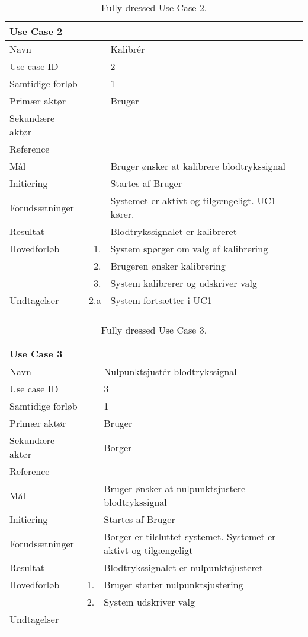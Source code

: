 \begin{longtabu} to  %
    {\large \textbf{Use Case 2}} && \\
    \toprule
    Navn &&    Kalibrér\\
    Use case ID &&    2\\
    Samtidige forløb &&    1\\
    Primær aktør &&    Bruger\\
    Sekundære aktør &&	 \\
    Reference &&      \\
    Mål &&    Bruger ønsker at kalibrere blodtrykssignal\\
    Initiering &&	Startes af Bruger\\
    Forudsætninger &&  Systemet er aktivt og tilgængeligt. UC1 kører.\\
    Resultat &&		Blodtrykssignalet er kalibreret                         \\ \midrule
    Hovedforløb &    1. &    System spørger om valg af kalibrering\\[-1ex]   				
    			&    2. &    Brugeren ønsker kalibrering\\
                &    3.	&	 System kalibrerer og udskriver valg\newline\\ \midrule
                
    Undtagelser &    2.a &   System fortsætter i UC1  \\ \bottomrule
\caption{Fully dressed Use Case 2.}
\label{UC2}
\end{longtabu}


\begin{longtabu} to  %
    {\large \textbf{Use Case 3}} && \\
    \toprule
    Navn &&    Nulpunktsjustér blodtrykssignal\\
    Use case ID &&    3\\
    Samtidige forløb &&    1\\
    Primær aktør &&    Bruger\\
    Sekundære aktør &&	Borger \\
    Reference &&      \\
    Mål &&    Bruger ønsker at nulpunktsjustere blodtrykssignal\\
    Initiering &&	Startes af Bruger\\
    Forudsætninger &&  Borger er tilsluttet systemet. Systemet er aktivt og tilgængeligt\\
    Resultat &&		Blodtrykssignalet er nulpunktsjusteret\\ \midrule
    Hovedforløb &    1. &    Bruger starter nulpunktsjustering\\[-1ex]   						 	
                &    2. &    System udskriver valg\newline\\ \midrule
                
    Undtagelser &     &      \\ \bottomrule
\caption{Fully dressed Use Case 3.}
\label{UC3}
\end{longtabu}

